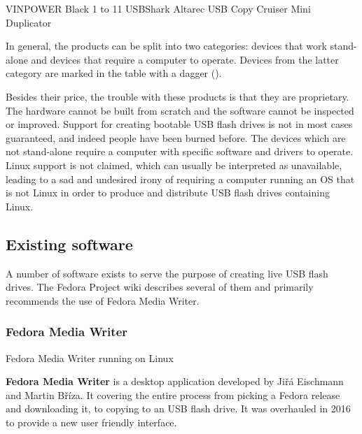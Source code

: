                 {VINPOWER Black 1 to 11 USBShark \cite{product-vinpower-11}}
                {Altarec USB Copy Cruiser Mini Duplicator \cite{product-altarec-10}}
            
            In general, the products can be split into two categories: devices that work stand-alone and devices that require a computer to operate.  Devices from the latter category are marked in the table with a dagger (\textdagger).
            
            Besides their price, the trouble with these products is that they are proprietary.  The hardware cannot be built from scratch and the software cannot be inspected or improved.  Support for creating bootable USB flash drives is not in most cases guaranteed, and indeed people have been burned before\cite{open-security-research-simple-duplicator}.  The devices which are not stand-alone require a computer with specific software and drivers to operate.  Linux support is not claimed, which can usually be interpreted as unavailable, leading to a sad and undesired irony of requiring a computer running an OS that is not Linux in order to produce and distribute USB flash drives containing Linux.
        \subsection{Existing software}
            A number of software exists to serve the purpose of creating live USB flash drives.  The Fedora Project wiki describes several of them and primarily recommends the use of Fedora Media Writer\cite{fedora-how-to-live-usb}.
            
            \subsubsection{Fedora Media Writer}
                    {Fedora Media Writer running on Linux \cite{fedora-media-writer-screenshot}}
                
                \textbf{Fedora Media Writer} is a desktop application developed by  Jiřá Eischmann and Martin Bříza.  It covering the entire process from picking a Fedora release and downloading it, to copying to an USB flash drive.  It was overhauled in 2016 to provide a new user friendly interface\cite{fedora-luc-as-primary-downloadable}.
                
